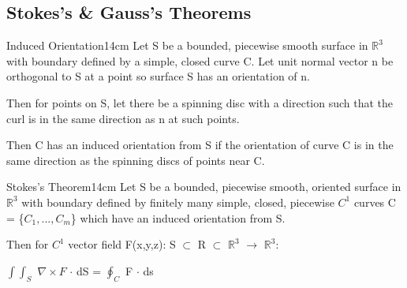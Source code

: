     \newpage





\subsection{ Stokes's \& Gauss's Theorems }

    \begin{definition}{Induced Orientation}{14cm}
        Let S be a bounded, piecewise smooth surface in $\mathbb{R}^3$
        with boundary defined by a simple, closed curve C.
        Let unit normal vector n be orthogonal to S at a point
        so surface S has an orientation of n.

        Then for points on S, let there be a spinning disc with a direction
        such that the curl is in the same direction as n at such points.

        Then C has an {\color{lblue} induced orientation} from S
        if the orientation of curve C is in the same direction as
        the spinning discs of points near C.
    \end{definition}

    \vspace{0.5cm}



    \begin{wtheorem}{Stokes's Theorem}{14cm}
        Let S be a bounded, piecewise smooth, oriented surface in $\mathbb{R}^3$
        with boundary defined by finitely many simple, closed, piecewise $C^1$
        curves C = \{$C_1,...,C_m$\} which have an induced orientation from S.

        Then for $C^1$ vector field F(x,y,z): S $\subset$ R $\subset$
        $\mathbb{R}^3$ $\rightarrow$ $\mathbb{R}^3$:

        \hspace{0.5cm}
        $\int \int_S$ $\nabla \times F$ $\cdot$ dS
        = $\oint_C$ F $\cdot$ ds
    \end{wtheorem}

    \vspace{0.5cm}



